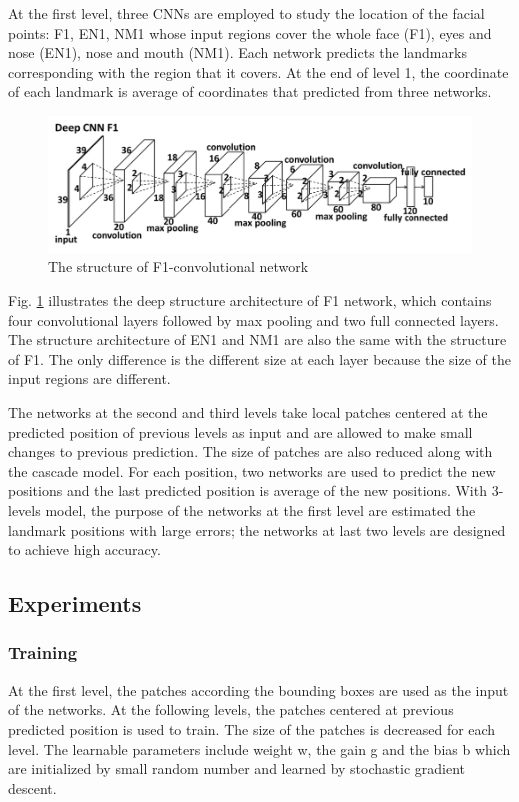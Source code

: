 At the first level, three CNNs are employed to study the location of the facial points: F1, EN1, NM1 whose input regions cover the whole face (F1), eyes and nose (EN1), nose and mouth (NM1). Each network predicts the landmarks corresponding with the region that it covers. At the end of level 1, the coordinate of each landmark is average of coordinates that predicted from three networks.
\begin{figure}[h]
	\centering
	\includegraphics[scale=0.3]{images/1Fconv}
	\caption{The structure of F1-convolutional network}
	\label{1Fconv}
\end{figure}
Fig. \ref{1Fconv} illustrates the deep structure architecture of F1 network, which contains four convolutional layers followed by max pooling and two full connected layers. The structure architecture of EN1 and NM1 are also the same with the structure of F1. The only difference is the different size at each layer because the size of the input regions are different.

The networks at the second and third levels take local patches centered at the predicted position of previous levels as input and are allowed to make small changes to previous prediction. The size of patches are also reduced along with the cascade model. For each position, two networks are used to predict the new positions and the last predicted position is average of the new positions. With 3-levels model, the purpose of the networks at the first level are estimated the landmark positions with large errors; the networks at last two levels are designed to achieve high accuracy.
\subsection{Experiments}
\subsubsection{Training}
At the first level, the patches according the bounding boxes are used as the input of the networks. At the following levels, the patches centered at previous predicted position is used to train. The size of the patches is decreased for each level. The learnable parameters include weight w, the gain g and the bias b which are initialized by small random number and learned by stochastic gradient descent.

